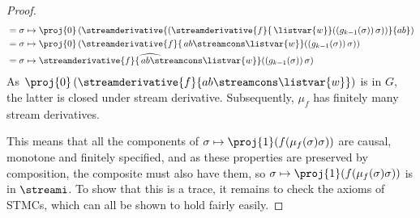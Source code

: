 \begin{proof}
\begin{align*}
            &= \sigma \mapsto \proj{0}\left(\streamderivative{\left(\streamderivative{f}{\, \listvar{w}}(\left(g_{k-1}(\sigma)\right)\sigma)\right)}{ab}\right) \\
            &= \sigma \mapsto \proj{0}\left(\streamderivative{f}{\, ab \streamcons \listvar{w}}(\left(g_{k-1}(\sigma)\right)\sigma)\right) \\
            &= \sigma \mapsto \widehat{\streamderivative{f}{\, ab \streamcons \listvar{w}}}(\left(g_{k-1}(\sigma)\right)\sigma)
        \end{align*}
    As \(\proj{0}\left(\streamderivative{f}{ab \streamcons \listvar{w}}\right)\)
    is in \(G\), the latter  is closed under stream derivative.
    Subsequently, \(\mu_f\) has finitely many stream derivatives.

    This means that all the components of
    \(\sigma \mapsto \proj{1}(f(\mu_f(\sigma)\sigma))\) are causal, monotone and
    finitely specified, and as these properties are preserved by composition,
    the composite must also have them, so
    \(\sigma \mapsto \proj{1}(f(\mu_f(\sigma)\sigma))\) is in \(\streami\).
    To show that this is a trace, it remains to check the axioms of STMCs,
    which can all be shown to hold fairly easily.
\end{proof}
